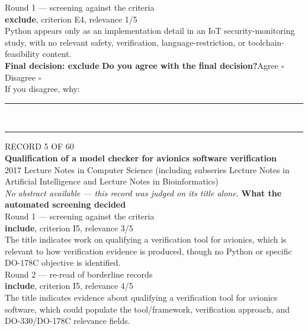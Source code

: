 \documentclass[11pt,a4paper]{article}
\begin{document}
{\footnotesize\color{soft}Round 1 --- screening against the criteria}\\[0.5mm]
{\small\textbf{exclude}, criterion E4, relevance 1/5}\\[0.5mm]
{\small Python appears only as an implementation detail in an IoT security-monitoring study, with no relevant safety, verification, language-restriction, or toolchain-feasibility content.}\\[2.5mm]
{\small\textbf{Final decision: exclude}}
\vspace{2mm}
{\small\textbf{Do you agree with the final decision?}\quad{}Agree $\square$\qquad{}Disagree $\square$}\\[1mm]
{\footnotesize\color{soft}If you disagree, why:}\\[1mm]
\color{rule}\rule{\linewidth}{0.3pt}\\[3mm]\rule{\linewidth}{0.3pt}\color{black}
\clearpage
{\color{soft}\footnotesize RECORD 5 OF 60}\\[1mm]
{\large\bfseries Qualification of a model checker for avionics software verification}\\[1.5mm]
{\color{soft}\small 2017 \textperiodcentered{} Lecture Notes in Computer Science (including subseries Lecture Notes in Artificial Intelligence and Lecture Notes in Bioinformatics)}\\[2mm]
{\small\itshape\color{soft}No abstract available --- this record was judged on its title alone.}
\vspace{3mm}
\vspace{2.5mm}
{\small\textbf{What the automated screening decided}}\\[2mm]
{\footnotesize\color{soft}Round 1 --- screening against the criteria}\\[0.5mm]
{\small\textbf{include}, criterion I5, relevance 3/5}\\[0.5mm]
{\small The title indicates work on qualifying a verification tool for avionics, which is relevant to how verification evidence is produced, though no Python or specific DO-178C objective is identified.}\\[2.5mm]
{\footnotesize\color{soft}Round 2 --- re-read of borderline records}\\[0.5mm]
{\small\textbf{include}, criterion I5, relevance 4/5}\\[0.5mm]
{\small The title indicates evidence about qualifying a verification tool for avionics software, which could populate the tool/framework, verification approach, and DO-330/DO-178C relevance fields.}\\[2.5mm]
\end{document}
